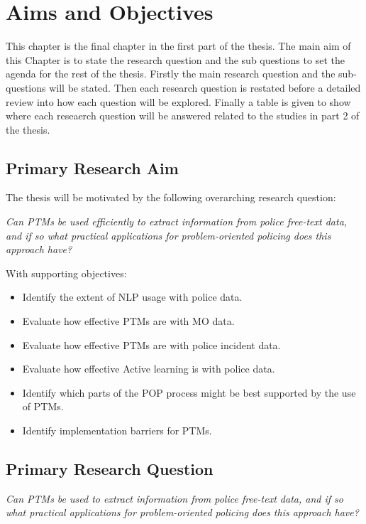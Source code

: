 \chapter{Aims and Objectives} This chapter is the final chapter in the first part of the thesis. The main aim of this Chapter is to state the research question and the sub questions to set the agenda for the rest of the thesis. Firstly the main research question and the sub-questions will be stated. Then each research question is restated before a detailed review into how each question will be explored. Finally a table is given to show where each reseaerch question will be answered related to the studies in part 2 of the thesis.

\section{Primary Research Aim}
The thesis will be motivated by the following overarching research question: 

\emph{Can PTMs be used efficiently to extract information from police free-text data, and if so what practical applications for problem-oriented policing does this approach have?}

With supporting objectives:
\begin{itemize}
\item Identify the extent of NLP usage with police data.

\item Evaluate how effective PTMs are with MO data.

\item Evaluate how effective PTMs are with police incident data.

\item Evaluate how effective Active learning is with police data.

\item Identify which parts of the POP process might be best supported by the use of PTMs.

\item Identify implementation barriers for PTMs.

\end{itemize}

\section{Primary Research Question}

\emph{Can PTMs be used to extract information from police free-text data, and if so what practical applications for problem-oriented policing does this approach have?}

